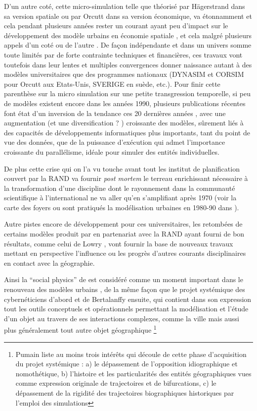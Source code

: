 D'un autre coté, cette micro-simulation telle que théorisé par Hägerstrand dans sa version spatiale ou par Orcutt dans sa version économique, va étonnamment et cela pendant plusieurs années rester un courant ayant peu d'impact sur le développement des modèle urbains en économie spatiale \autocite[5]{Sanders2006}, et cela malgré plusieurs appels d'un coté \autocite{Hagerstrand1970} ou de l'autre \autocite[5]{Isard1998}. De façon indépendante et dans un univers somme toute limités par de forte contrainte techniques et financières, ces travaux vont toutefois dans leur lentes et multiples convergences donner naissance autant à des modèles universitaires que des programmes nationaux (DYNASIM et CORSIM pour Orcutt aux Etats-Unis, SVERIGE en suède, etc.). Pour finir cette parenthèse sur la micro simulation sur une petite transgression temporelle, si peu de modèles existent encore dans les années 1990, plusieurs publications récentes font état d'un inversion de la tendance ces 20 dernières années \autocite{Lenormand2013}, avec une augmentation (et une diversification ? ) croissante des modèles, sûrement liés à des capacités de développements informatiques plus importants, tant du point de vue des données, que de la puissance d’exécution qui admet l'importance croissante du parallélisme, idéale pour simuler des entités individuelles. \autocite[5]{Sanders2006} \autocite{Lenormand2013}

De plus cette crise qui on l'a vu touche avant tout les institut de planification couvert par la RAND va fournir \textit{post mortem} le terreau enrichissant nécessaire à la transformation d'une discipline dont le rayonnement dans la communauté scientifique à l'international ne va aller qu'en s'amplifiant après 1970 (voir la carte des foyers ou sont pratiqués la modélisation urbaines en 1980-90 dans \autocite{Wegener1994}).

Autre pistes encore de développement pour ces universitaires, les retombées de certains modèles produit par en partenariat avec la RAND ayant fourni de bon résultats, comme celui de Lowry \autocite{Lowry1964}, vont fournir la base de nouveaux travaux mettant en perspective l'influence ou les progrès d'autres courants disciplinaires en contact avec la géographie. 

Ainsi la \foreignquote{english}{social physics} de \autocite{Wilson1970} est considéré comme un moment important dans le renouveau des modèles urbains \autocite{Griffith2010}, de la même façon que le projet systémique des cybernéticiens d'abord et de Bertalanffy ensuite, qui contient dans son expression tout les outils conceptuels et opérationnels permettant la modélisation et l'étude d'un objet au travers de ses interactions complexes, comme la ville \autocite{Forrester1969} \autocite[11]{Batty1976, Batty2001} mais aussi plus généralement tout autre objet géographique \autocite[27-28]{Pumain2003} \footnote{ Pumain liste au moins trois intérêts qui découle de cette phase d'acquisition du projet systémique : a) le dépassement de l'opposition idiographique et nomothétique, b) l'histoire et les particularités des entités géographiques vues comme expression originale de trajectoires et de bifurcations, c) le dépassement de la rigidité des trajectoires biographiques historiques par l'emploi des simulations}

